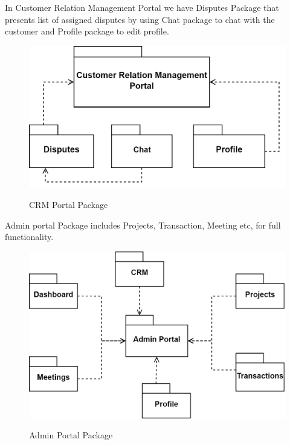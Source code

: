 In Customer Relation Management Portal we have Disputes Package that presents list of assigned disputes by using Chat package to chat with the customer and Profile package to edit profile.
\begin{figure}[H]
	\begin{center}
		{\includegraphics[scale=0.8]{figures/web Concept/web-crm_package.png}}
		\caption{CRM Portal Package}
	\end{center}
\end{figure}

Admin portal Package includes Projects, Transaction, Meeting etc, for full functionality.
\begin{figure}[H]
	\begin{center}

		{\includegraphics[scale=1]{figures/web Concept/web-admin_package.png}}
		\caption{Admin Portal Package}
	\end{center}
\end{figure}

